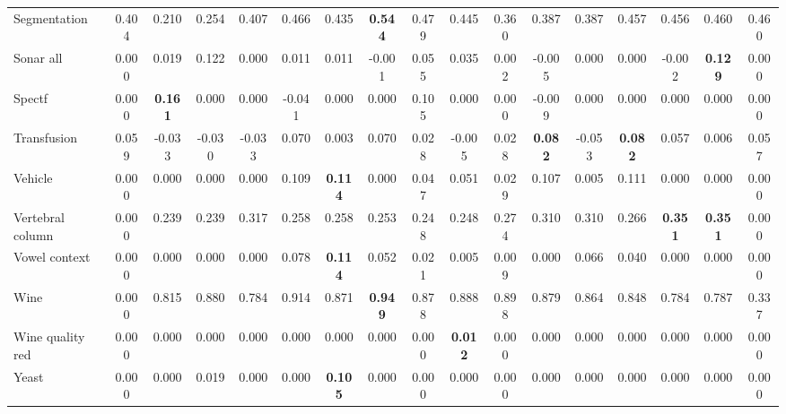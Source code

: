 \begin{tabular}{lcccccccccccccccc}
Segmentation & 0.404 & 0.210 & 0.254 & 0.407 & 0.466 & 0.435 & \textbf{0.544} & 0.479 & 0.445 & 0.360 & 0.387 & 0.387 & 0.457 & 0.456 & 0.460 & 0.460 \\
Sonar all & 0.000 & 0.019 & 0.122 & 0.000 & 0.011 & 0.011 & -0.001 & 0.055 & 0.035 & 0.002 & -0.005 & 0.000 & 0.000 & -0.002 & \textbf{0.129} & 0.000 \\
Spectf & 0.000 & \textbf{0.161} & 0.000 & 0.000 & -0.041 & 0.000 & 0.000 & 0.105 & 0.000 & 0.000 & -0.009 & 0.000 & 0.000 & 0.000 & 0.000 & 0.000 \\
Transfusion & 0.059 & -0.033 & -0.030 & -0.033 & 0.070 & 0.003 & 0.070 & 0.028 & -0.005 & 0.028 & \textbf{0.082} & -0.053 & \textbf{0.082} & 0.057 & 0.006 & 0.057 \\
Vehicle & 0.000 & 0.000 & 0.000 & 0.000 & 0.109 & \textbf{0.114} & 0.000 & 0.047 & 0.051 & 0.029 & 0.107 & 0.005 & 0.111 & 0.000 & 0.000 & 0.000 \\
Vertebral column & 0.000 & 0.239 & 0.239 & 0.317 & 0.258 & 0.258 & 0.253 & 0.248 & 0.248 & 0.274 & 0.310 & 0.310 & 0.266 & \textbf{0.351} & \textbf{0.351} & 0.000 \\
Vowel context & 0.000 & 0.000 & 0.000 & 0.000 & 0.078 & \textbf{0.114} & 0.052 & 0.021 & 0.005 & 0.009 & 0.000 & 0.066 & 0.040 & 0.000 & 0.000 & 0.000 \\
Wine & 0.000 & 0.815 & 0.880 & 0.784 & 0.914 & 0.871 & \textbf{0.949} & 0.878 & 0.888 & 0.898 & 0.879 & 0.864 & 0.848 & 0.784 & 0.787 & 0.337 \\
Wine quality red & 0.000 & 0.000 & 0.000 & 0.000 & 0.000 & 0.000 & 0.000 & 0.000 & \textbf{0.012} & 0.000 & 0.000 & 0.000 & 0.000 & 0.000 & 0.000 & 0.000 \\
Yeast & 0.000 & 0.000 & 0.019 & 0.000 & 0.000 & \textbf{0.105} & 0.000 & 0.000 & 0.000 & 0.000 & 0.000 & 0.000 & 0.000 & 0.000 & 0.000 & 0.000 \\
\bottomrule\end{tabular}
